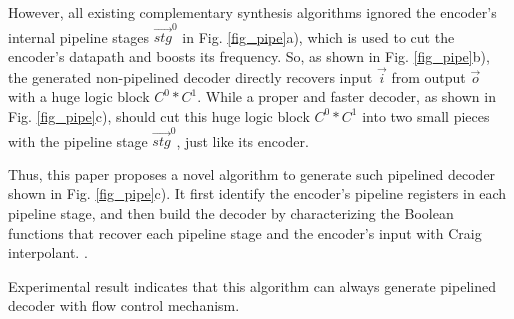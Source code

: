 \documentclass[conference]{IEEEtran}
\begin{document}
However,
all existing complementary synthesis algorithms \cite{ShenICCAD09,ShenTCAD10,ShenTCAD11,ShenICCAD11,ShenTCAD12,LiuICCAD11,LiuTCAD12,TuDAC13,QinTODAES15}
ignored the encoder's 
internal pipeline stages $\vec{stg}^0$ in Fig. \ref{fig_pipe}a),
which is used to cut the encoder's datapath and boosts its frequency.
So,
as shown in Fig. \ref{fig_pipe}b),
the generated non-pipelined decoder 
directly recovers input $\vec{i}$ from output $\vec{o}$ with a huge logic block $C^0*C^1$.
While a proper and faster decoder,
as shown in Fig. \ref{fig_pipe}c),
should cut this huge logic block $C^0*C^1$ into two small pieces with the pipeline stage $\vec{stg}^0$,
just like its encoder.






Thus,
this paper proposes a novel algorithm to generate such pipelined decoder shown in Fig. \ref{fig_pipe}c).
It first identify the encoder's pipeline registers in each pipeline stage,
and then build the decoder by characterizing the Boolean functions that recover each pipeline stage and the encoder's input
with Craig interpolant. \cite{InterpBoolFunction}.





Experimental result indicates that this algorithm can always 
generate pipelined decoder with flow control mechanism.
\end{document}
